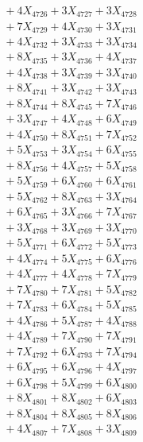 \documentclass[a4paper,10pt]{article}
\begin{document}
{\begin{align}
&\;  + 4 X_{4726} + 3 X_{4727} + 3 X_{4728} \\[0.3ex]
&\;  + 7 X_{4729} + 4 X_{4730} + 3 X_{4731} \\[0.3ex]
&\;  + 4 X_{4732} + 3 X_{4733} + 3 X_{4734} \\[0.3ex]
&\;  + 8 X_{4735} + 3 X_{4736} + 4 X_{4737} \\[0.3ex]
&\;  + 4 X_{4738} + 3 X_{4739} + 3 X_{4740} \\[0.3ex]
&\;  + 8 X_{4741} + 3 X_{4742} + 3 X_{4743} \\[0.3ex]
&\;  + 8 X_{4744} + 8 X_{4745} + 7 X_{4746} \\[0.3ex]
&\;  + 3 X_{4747} + 4 X_{4748} + 6 X_{4749} \\[0.5ex]\allowbreak
&\;  + 4 X_{4750} + 8 X_{4751} + 7 X_{4752} \\[0.3ex]
&\;  + 5 X_{4753} + 3 X_{4754} + 6 X_{4755} \\[0.3ex]
&\;  + 8 X_{4756} + 4 X_{4757} + 5 X_{4758} \\[0.3ex]
&\;  + 5 X_{4759} + 6 X_{4760} + 6 X_{4761} \\[0.3ex]
&\;  + 5 X_{4762} + 8 X_{4763} + 3 X_{4764} \\[0.3ex]
&\;  + 6 X_{4765} + 3 X_{4766} + 7 X_{4767} \\[0.3ex]
&\;  + 3 X_{4768} + 3 X_{4769} + 3 X_{4770} \\[0.3ex]
&\;  + 5 X_{4771} + 6 X_{4772} + 5 X_{4773} \\[0.3ex]
&\;  + 4 X_{4774} + 5 X_{4775} + 6 X_{4776} \\[0.3ex]
&\;  + 4 X_{4777} + 4 X_{4778} + 7 X_{4779} \\[0.5ex]\allowbreak
&\;  + 7 X_{4780} + 7 X_{4781} + 5 X_{4782} \\[0.3ex]
&\;  + 7 X_{4783} + 6 X_{4784} + 5 X_{4785} \\[0.3ex]
&\;  + 4 X_{4786} + 5 X_{4787} + 4 X_{4788} \\[0.3ex]
&\;  + 4 X_{4789} + 7 X_{4790} + 7 X_{4791} \\[0.3ex]
&\;  + 7 X_{4792} + 6 X_{4793} + 7 X_{4794} \\[0.3ex]
&\;  + 6 X_{4795} + 6 X_{4796} + 4 X_{4797} \\[0.3ex]
&\;  + 6 X_{4798} + 5 X_{4799} + 6 X_{4800} \\[0.3ex]
&\;  + 8 X_{4801} + 8 X_{4802} + 6 X_{4803} \\[0.3ex]
&\;  + 8 X_{4804} + 8 X_{4805} + 8 X_{4806} \\[0.3ex]
&\;  + 4 X_{4807} + 7 X_{4808} + 3 X_{4809} \\[0.5ex]\allowbreak

\end{align}}
\end{document}
